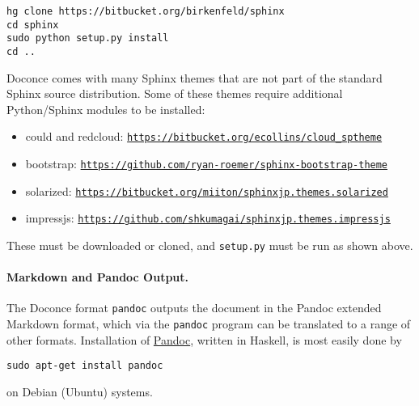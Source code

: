 \documentclass[%
oneside,                 %
final,                   %
10pt]{article}
\begin{document}
\vspace{4pt}
\begin{Verbatim}[numbers=none,frame=lines,label=\fbox{{\tiny Terminal}},fontsize=\fontsize{9pt}{9pt},
labelposition=topline,framesep=2.5mm,framerule=0.7pt]
hg clone https://bitbucket.org/birkenfeld/sphinx
cd sphinx
sudo python setup.py install
cd ..
\end{Verbatim}

Doconce comes with many Sphinx themes that are not part of the
standard Sphinx source distribution. Some of these themes require
additional Python/Sphinx modules to be installed:

\begin{itemize}
 \item could and redcloud: \href{{https://bitbucket.org/ecollins/cloud_sptheme}}{\nolinkurl{https://bitbucket.org/ecollins/cloud_sptheme}}

 \item bootstrap: \href{{https://github.com/ryan-roemer/sphinx-bootstrap-theme}}{\nolinkurl{https://github.com/ryan-roemer/sphinx-bootstrap-theme}}

 \item solarized: \href{{https://bitbucket.org/miiton/sphinxjp.themes.solarized}}{\nolinkurl{https://bitbucket.org/miiton/sphinxjp.themes.solarized}}

 \item impressjs: \href{{https://github.com/shkumagai/sphinxjp.themes.impressjs}}{\nolinkurl{https://github.com/shkumagai/sphinxjp.themes.impressjs}}
\end{itemize}

\noindent
These must be downloaded or cloned, and {\fontsize{10pt}{10pt}\Verb!setup.py!} must be run as shown
above.

\paragraph{Markdown and Pandoc Output.}
The Doconce format {\fontsize{10pt}{10pt}\Verb!pandoc!} outputs the document in the Pandoc
extended Markdown format, which via the {\fontsize{10pt}{10pt}\Verb!pandoc!} program can be
translated to a range of other formats. Installation of \href{{http://johnmacfarlane.net/pandoc/}}{Pandoc}, written in Haskell, is most
easily done by

\vspace{4pt}
\begin{Verbatim}[numbers=none,frame=lines,label=\fbox{{\tiny Terminal}},fontsize=\fontsize{9pt}{9pt},
labelposition=topline,framesep=2.5mm,framerule=0.7pt]
sudo apt-get install pandoc
\end{Verbatim}
on Debian (Ubuntu) systems.
\end{document}
